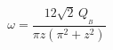 \begin{equation}
\omega =\frac{12\sqrt{2}\,Q_{_{B}}}{\pi z\left( \pi
^{2}+z^{2}\right) }
\end{equation}

